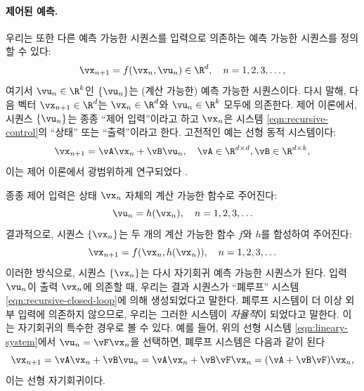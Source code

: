 \documentclass[../../book-main_ko.tex]{subfiles}
\begin{document}
\paragraph{제어된 예측.}
우리는 또한 다른 예측 가능한 시퀀스를 입력으로 의존하는 예측 가능한 시퀀스를 정의할 수 있다:
\begin{equation}
    \vx_{n+1} = f(\vx_{n}, \vu_{n}) \in \R^{d}, \quad n = 1, 2, 3, \ldots,
    \label{eqn:recursive-control}
\end{equation}
여기서 \(\vu_{n} \in \R^{k}\)인 \(\{\vu_{n}\}\)는 (계산 가능한) 예측 가능한 시퀀스이다. 다시 말해, 다음 벡터 \(\vx_{n+1} \in \R^{d}\)는 \(\vx_{n} \in \R^{d}\)와 \(\vu_{n} \in \R^{k}\) 모두에 의존한다. 제어 이론에서, 시퀀스 \(\{\vu_{n}\}\)는 종종 ``제어 입력''이라고 하고 \(\vx_{n}\)은 시스템 \eqref{eqn:recursive-control}의 ``상태'' 또는 ``출력''이라고 한다. 고전적인 예는 선형 동적 시스템이다:
\begin{equation}
    \vx_{n+1} = \vA\vx_{n} + \vB\vu_{n}, \quad \vA \in \R^{d \times d}, \vB \in \R^{d \times k},
    \label{eqn:lineary-system}
\end{equation}
이는 제어 이론에서 광범위하게 연구되었다 \cite{Cal:Des}.

종종 제어 입력은 상태 \(\vx_{n}\) 자체의 계산 가능한 함수로 주어진다:
\begin{equation}
    \vu_{n} = h(\vx_{n}), \quad n = 1, 2, 3, \ldots
    \label{eqn:control-function}
\end{equation}
결과적으로, 시퀀스 \(\{\vx_{n}\}\)는 두 개의 계산 가능한 함수 \(f\)와 \(h\)를 합성하여 주어진다:
\begin{equation}
    \vx_{n+1} = f(\vx_{n}, h(\vx_{n})), \quad n = 1, 2, 3, \ldots
    \label{eqn:recursive-closed-loop}
\end{equation}
이러한 방식으로, 시퀀스 \(\{\vx_{n}\}\)는 다시 자기회귀 예측 가능한 시퀀스가 된다. 입력 \(\vu_{n}\)이 출력 \(\vx_{n}\)에 의존할 때, 우리는 결과 시퀀스가 ``폐루프'' 시스템 \eqref{eqn:recursive-closed-loop}에 의해 생성되었다고 말한다. 폐루프 시스템이 더 이상 외부 입력에 의존하지 않으므로, 우리는 그러한 시스템이 \textit{자율적}이 되었다고 말한다. 이는 자기회귀의 특수한 경우로 볼 수 있다. 예를 들어, 위의 선형 시스템 \eqref{eqn:lineary-system}에서 \(\vu_{n} = \vF\vx_{n}\)을 선택하면, 폐루프 시스템은 다음과 같이 된다
\begin{equation}
    \vx_{n+1} = \vA\vx_{n} + \vB\vu_{n} = \vA\vx_{n} + \vB\vF\vx_{n} = (\vA + \vB\vF)\vx_{n},
    \label{eqn:lineary-system-closed}
\end{equation}
이는 선형 자기회귀이다.
\end{document}
